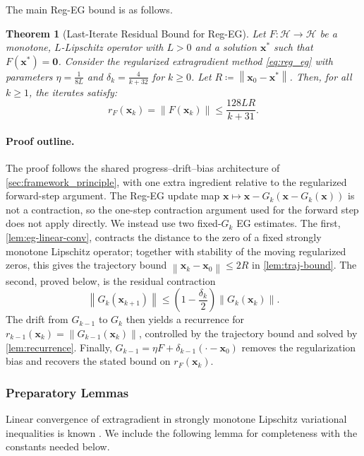 \documentclass[letterpaper,11pt]{article}
\newcommand{\norm}[1]{\left\| #1 \right\|}
\newcommand{\vect}[1]{\mathbf{#1}}
\newtheorem{theorem}{Theorem}
\begin{document}
The main Reg-EG bound is as follows.
\begin{theorem}[Last-Iterate Residual Bound for Reg-EG] \label{thm:reg_eg}
Let \(F:\mathcal H\to\mathcal H\) be a monotone, \(L\)-Lipschitz operator with \(L>0\) and a solution \(\vect{x}^*\) such that \(F(\vect{x}^*) = \vect{0}\). Consider the regularized extragradient method \eqref{eq:reg_eg} with parameters \(\eta = \frac{1}{8L}\) and \(\delta_k = \frac{4}{k+32}\) for \(k \ge 0\). Let \(R \coloneqq \norm{\vect{x}_0 - \vect{x}^*}\). Then, for all \(k\ge1\), the iterates satisfy:
\[
    r_F(\vect{x}_k)=\norm{F(\vect{x}_k)} \le \frac{128LR}{k+31}.
\]
\end{theorem}

\paragraph{Proof outline.}
The proof follows the shared progress--drift--bias architecture of
\cref{sec:framework_principle}, with one extra ingredient relative to the
regularized forward-step argument. The Reg-EG update map
\(\vect{x}\mapsto \vect{x}-G_k(\vect{x}-G_k(\vect{x}))\) is not a contraction,
so the one-step contraction argument used for the forward step does not apply
directly. We instead use two fixed-\(G_k\) EG estimates. The first,
\cref{lem:eg-linear-conv}, contracts the distance to the zero of a fixed
strongly monotone Lipschitz operator; together with stability of the moving
regularized zeros, this gives the trajectory bound
\(\norm{\vect{x}_k-\vect{x}_0}\le2R\) in \cref{lem:traj-bound}. The second,
proved below, is the residual contraction
\[
    \norm{G_k(\vect{x}_{k+1})}
    \le
    \left(1-\frac{\delta_k}{2}\right)\norm{G_k(\vect{x}_k)}.
\]
The drift from \(G_{k-1}\) to \(G_k\) then yields a recurrence for
\(r_{k-1}(\vect{x}_k)=\norm{G_{k-1}(\vect{x}_k)}\), controlled by the trajectory
bound and solved by \cref{lem:recurrence}. Finally,
\(G_{k-1}=\eta F+\delta_{k-1}(\cdot-\vect{x}_0)\) removes the regularization
bias and recovers the stated bound on \(r_F(\vect{x}_k)\).

\subsubsection{Preparatory Lemmas}

Linear convergence of extragradient in strongly monotone Lipschitz variational inequalities is known
\cite{tseng1995linear}. We include the following lemma for completeness with the constants needed below.
\end{document}
